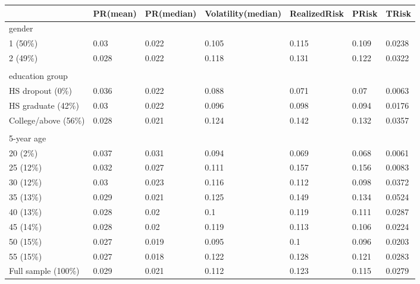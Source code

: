 \begin{table}
{\begin{tabular}{lllllll}
\hline \hline 
                       & PR(mean)   & PR(median) & Volatility(median) & RealizedRisk & PRisk & TRisk  \\
                       \hline 
gender                 &            &            &                    &              &       &        \\
\hline 
1 (50\%)               & 0.03       & 0.022      & 0.105              & 0.115        & 0.109 & 0.0238 \\
2 (49\%)               & 0.028      & 0.022      & 0.118              & 0.131        & 0.122 & 0.0322 \\
                       &            &            &                    &              &       &        \\
                       \hline 
\multicolumn{2}{l}{education group} &            &                    &              &       &        \\
\hline 
HS dropout (0\%)       & 0.036      & 0.022      & 0.088              & 0.071        & 0.07  & 0.0063 \\
HS graduate (42\%)     & 0.03       & 0.022      & 0.096              & 0.098        & 0.094 & 0.0176 \\
College/above (56\%)   & 0.028      & 0.021      & 0.124              & 0.142        & 0.132 & 0.0357 \\
                       &            &            &                    &              &       &        \\
                       \hline 
5-year age             &            &            &                    &              &       &        \\
\hline 
20 (2\%)               & 0.037      & 0.031      & 0.094              & 0.069        & 0.068 & 0.0061 \\
25 (12\%)              & 0.032      & 0.027      & 0.111              & 0.157        & 0.156 & 0.0083 \\
30 (12\%)              & 0.03       & 0.023      & 0.116              & 0.112        & 0.098 & 0.0372 \\
35 (13\%)              & 0.029      & 0.021      & 0.125              & 0.149        & 0.134 & 0.0524 \\
40 (13\%)              & 0.028      & 0.02       & 0.1                & 0.119        & 0.111 & 0.0287 \\
45 (14\%)              & 0.028      & 0.02       & 0.119              & 0.113        & 0.106 & 0.0224 \\
50 (15\%)              & 0.027      & 0.019      & 0.095              & 0.1          & 0.096 & 0.0203 \\
55 (15\%)              & 0.027      & 0.018      & 0.122              & 0.128        & 0.121 & 0.0283 \\
\hline 
Full sample (100\%)          & 0.029      & 0.021      & 0.112              & 0.123        & 0.115 & 0.0279 \\
\hline \hline 
\end{tabular}

}
\end{table}
